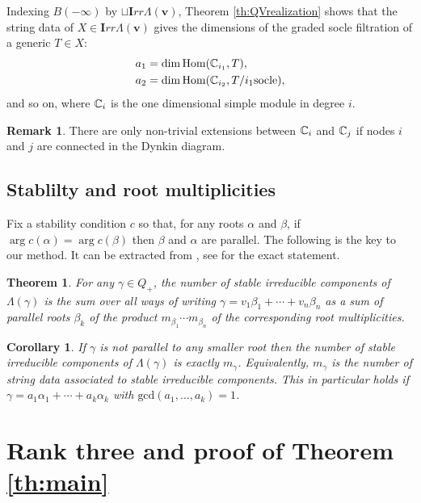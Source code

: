\documentclass{amsart}
\numberwithin{equation}{section}
\numberwithin{figure}{section}
\numberwithin{table}{section}
\newtheorem{Theorem}[equation]{Theorem}
\newtheorem{Corollary}[equation]{Corollary}
\theoremstyle{definition}
\newtheorem{Remark}[equation]{Remark}
\newcommand{\Irr}{{\bm Irr}}
\newcommand{\bfv}{{\bm v}}
\newcommand{\Hom}{\text{Hom}}
\begin{document}
Indexing $B(-\infty)$ by $\sqcup \Irr \Lambda(\bfv)$, Theorem \ref{th:QVrealization} shows that the string data of $X \in\Irr \Lambda(\bfv)$ gives the dimensions of the graded socle filtration of a generic $T \in X$:
$$
\begin{aligned}
& a_1 = \dim \Hom({\Bbb C}_{i_1}, T), \\
& a_2= \dim \Hom({\Bbb C}_{i_2}, T/i_1 \text{socle}) ,\\
\end{aligned}
$$
and so on, where ${\Bbb C}_i$ is the one dimensional simple module in degree $i$. 

\begin{Remark} \label{rem:connected}
There are only non-trivial extensions between ${\Bbb C}_i$ and ${\Bbb C}_j$ if nodes $i$ and $j$ are connected in the Dynkin diagram. 
\end{Remark}

\subsection{Stablilty and root multiplicities}
Fix a stability condition $c$ so that, for any roots $\alpha$ and $\beta$, if $\arg c(\alpha)=\arg c(\beta)$ then $\beta$ and $\alpha$ are parallel. The following is the key to our method. It can be extracted from \cite{BKT:2014}, see \cite[Theorem 3.3]{T21} for the exact statement. 

\begin{Theorem} \label{th:BigK}
For any $\gamma \in Q_+$, the number of stable irreducible components of $\Lambda(\gamma)$ is the sum over all ways of writing $\gamma=v_1\beta_1+\cdots+v_n \beta_n$ as a sum of parallel roots $\beta_k$
of the product $m_{\beta_1} \cdots m_{\beta_n}$ of the corresponding root multiplicities. 
\end{Theorem}

\begin{Corollary}
If $\gamma$ is not parallel to any smaller root then the number of stable irreducible components of $\Lambda(\gamma)$ is exactly $m_\gamma$. Equivalently, $m_\gamma$ is the number of string data associated to stable irreducible components. This in particular holds if $\gamma = a_1 \alpha_1 + \cdots + a_k \alpha_k$ with $\text{gcd} (a_1, \ldots, a_k)=1$. 
\end{Corollary}




\section{Rank three and proof of Theorem \ref{th:main}}
\end{document}

